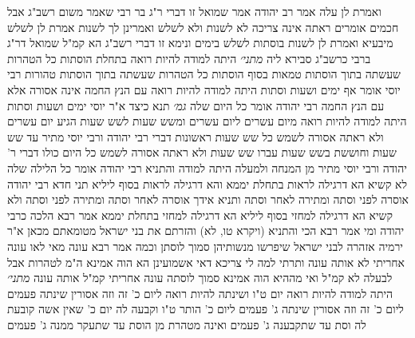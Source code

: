 \documentclass[12pt, openany]{book}
\begin{document}
{ואמרת לן עלה אמר רב יהודה אמר שמואל זו דברי ר"ג בר רבי שאמר משום רשב"ג אבל חכמים אומרים ראתה אינה צריכה לא לשנות ולא לשלש 
ואמרינן לך לשנות אמרת לן לשלש מיבעיא ואמרת לן לשנות בוסתות לשלש בימים 
ונימא זו דברי רשב"ג הא קמ"ל שמואל דר"ג ברבי כרשב"ג סבירא ליה
{\large\emph{מתני׳}} היתה למודה להיות רואה בתחלת הוסתות כל הטהרות שעשתה בתוך הוסתות טמאות בסוף הוסתות כל הטהרות שעשתה בתוך הוסתות טהורות 
רבי יוסי אומר אף ימים ושעות וסתות היתה למודה להיות רואה עם הנץ החמה אינה אסורה אלא עם הנץ החמה רבי יהודה אומר כל היום שלה
{\large\emph{גמ׳}} תנא כיצד א"ר יוסי ימים ושעות וסתות היתה למודה להיות רואה מיום עשרים ליום עשרים ומשש שעות לשש שעות הגיע יום עשרים ולא ראתה אסורה לשמש כל שש שעות ראשונות דברי רבי יהודה ורבי יוסי מתיר עד שש שעות וחוששת בשש שעות 
עברו שש שעות ולא ראתה אסורה לשמש כל היום כולו דברי ר' יהודה ורבי יוסי מתיר מן המנחה ולמעלה
היתה למודה והתניא רבי יהודה אומר כל הלילה שלה 
לא קשיא הא דרגילה לראות בתחלת יממא והא דרגילה לראות בסוף ליליא 
תני חדא רבי יהודה אוסרה לפני וסתה ומתירה לאחר וסתה ותניא אידך אוסרה לאחר וסתה ומתירה לפני וסתה 
ולא קשיא הא דרגילה למחזי בסוף ליליא הא דרגילה למחזי בתחלת יממא 
אמר רבא הלכה כרבי יהודה ומי אמר רבא הכי והתניא (ויקרא טו, לא) והזרתם את בני ישראל מטומאתם מכאן א"ר ירמיה אזהרה לבני ישראל שיפרשו מנשותיהן סמוך לוסתן 
וכמה אמר רבא עונה מאי לאו עונה אחריתי לא אותה עונה 
ותרתי למה לי צריכא דאי אשמועינן הא הוה אמינא ה"מ לטהרות אבל לבעלה לא קמ"ל 
ואי מההיא הוה אמינא סמוך לוסתה עונה אחריתי קמ"ל אותה עונה
{\large\emph{מתני׳}} היתה למודה להיות רואה יום ט"ו ושינתה להיות רואה ליום כ' זה וזה אסורין שינתה פעמים ליום כ' זה וזה אסורין 
שינתה ג' פעמים ליום כ' הותר ט"ו וקבעה לה יום כ' שאין אשה קובעת לה וסת עד שתקבענה ג' פעמים ואינה מטהרת מן הוסת עד שתעקר ממנה ג' פעמים}
\end{document}
